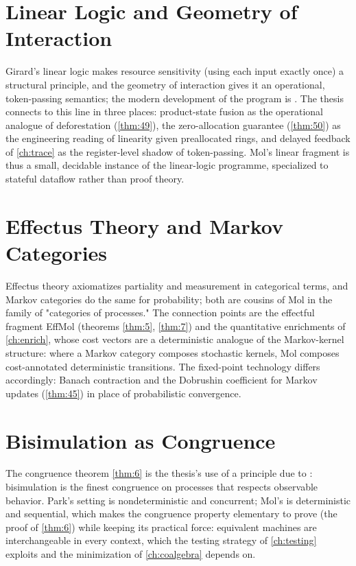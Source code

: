 \section{Linear Logic and Geometry of Interaction}
Girard's linear logic \cite{girard} makes resource sensitivity (using each input exactly once) a structural principle, and the geometry of interaction gives it an operational, token-passing semantics; the modern development of the program is \cite{arxiv-linear-logic-goi}. The thesis connects to this line in three places: product-state fusion as the operational analogue of deforestation (\ref{thm:49}), the zero-allocation guarantee (\ref{thm:50}) as the engineering reading of linearity given preallocated rings, and delayed feedback of \autoref{ch:trace} as the register-level shadow of token-passing. Mol's linear fragment is thus a small, decidable instance of the linear-logic programme, specialized to stateful dataflow rather than proof theory.

\section{Effectus Theory and Markov Categories}
Effectus theory \cite{arxiv-effectus} axiomatizes partiality and measurement in categorical terms, and Markov categories \cite{arxiv-markov-categories} do the same for probability; both are cousins of Mol in the family of "categories of processes." The connection points are the effectful fragment EffMol (theorems \ref{thm:5}, \ref{thm:7}) and the quantitative enrichments of \autoref{ch:enrich}, whose cost vectors are a deterministic analogue of the Markov-kernel structure: where a Markov category composes stochastic kernels, Mol composes cost-annotated deterministic transitions. The fixed-point technology differs accordingly: Banach contraction and the Dobrushin coefficient \cite{dobroushin} for Markov updates (\ref{thm:45}) in place of probabilistic convergence.

\section{Bisimulation as Congruence}
The congruence theorem \ref{thm:6} is the thesis's use of a principle due to \cite{park}: bisimulation is the finest congruence on processes that respects observable behavior. Park's setting is nondeterministic and concurrent; Mol's is deterministic and sequential, which makes the congruence property elementary to prove (the proof of \ref{thm:6}) while keeping its practical force: equivalent machines are interchangeable in every context, which the testing strategy of \autoref{ch:testing} exploits and the minimization of \autoref{ch:coalgebra} depends on.

